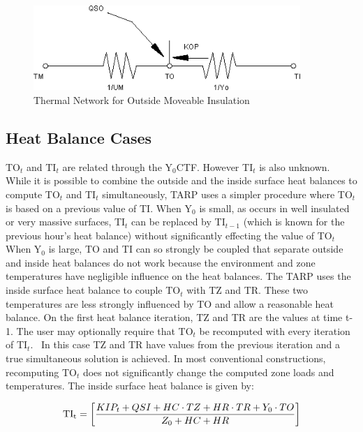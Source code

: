 \begin{figure}[hbtp] %
\centering
\includegraphics[width=0.9\textwidth, height=0.9\textheight, keepaspectratio=true]{media/image422.png}
\caption{Thermal Network for Outside Moveable Insulation \protect \label{fig:thermal-network-for-outside-moveable}}
\end{figure}

\subsection{Heat Balance Cases}\label{heat-balance-cases}

TO\(_{t}\) and TI\(_{t}\) are related through the Y\(_{0}\)CTF. However TI\(_{t}\) is also unknown. While it is possible to combine the outside and the inside surface heat balances to compute TO\(_{t}\) and TI\(_{t}\) simultaneously, TARP uses a simpler procedure where TO\(_{t}\) is based on a previous value of TI. When Y\(_{0}\) is small, as occurs in well insulated or very massive surfaces, TI\(_{t}\) can be replaced by TI\(_{t-1}\) (which is known for the previous hour's heat balance) without significantly effecting the value of TO\(_{t}\) When Y\(_{0}\) is large, TO and TI can so strongly be coupled that separate outside and inside heat balances do not work because the environment and zone temperatures have negligible influence on the heat balances. The TARP uses the inside surface heat balance to couple TO\(_{t}\) with TZ and TR. These two temperatures are less strongly influenced by TO and allow a reasonable heat balance. On the first heat balance iteration, TZ and TR are the values at time t-1. The user may optionally require that TO\(_{t}\) be recomputed with every iteration of TI\(_{t}\). ~In this case TZ and TR have values from the previous iteration and a true simultaneous solution is achieved. In most conventional constructions, recomputing TO\(_{t}\) does not significantly change the computed zone loads and temperatures. The inside surface heat balance is given by:

\begin{equation}
{\rm{T}}{{\rm{I}}_{\rm{t}}} = \left[ {\frac{{KI{P_t} + QSI + HC\cdot TZ + HR\cdot TR + {Y_0}\cdot TO}}{{{Z_0} + HC + HR}}} \right]
\label{eq:InsideSurfTempHeatBalEq}
\end{equation}

